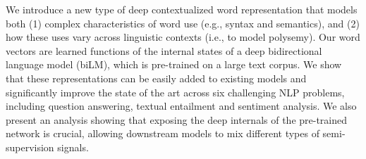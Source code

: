 We introduce a new type of deep contextualized word representation that models both (1) complex characteristics of word use (e.g., syntax and semantics), and (2) how these uses vary across linguistic contexts (i.e., to model polysemy). Our word vectors are learned functions of the internal states of a deep bidirectional language model (biLM), which is pre-trained on a large text corpus.  We show that these representations can be easily added to existing models and significantly improve the state of the art across six challenging NLP problems, including question answering, textual entailment and sentiment analysis. We also present an analysis showing that exposing the deep internals of the pre-trained network is crucial, allowing downstream models to mix different types of semi-supervision signals.
